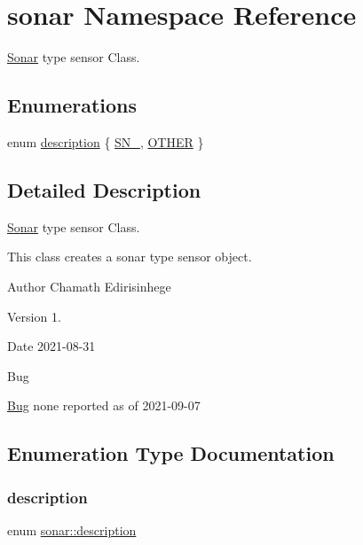 \hypertarget{namespacesonar}{}\section{sonar Namespace Reference}
\label{namespacesonar}


\hyperlink{classSonar}{Sonar} type sensor Class.  


\subsection*{Enumerations}
\begin{DoxyCompactItemize}
\item 
enum \hyperlink{namespacesonar_a3fd8bcda99ebc0ba5ba1f926196fdf6b}{description} \{ \hyperlink{namespacesonar_a3fd8bcda99ebc0ba5ba1f926196fdf6bace28bea2af6a79cd82af821642536337}{S\+N\+\_}, 
\hyperlink{namespacesonar_a3fd8bcda99ebc0ba5ba1f926196fdf6bac9f299206371e91f88ec91dd87a91b8f}{O\+T\+H\+ER}
 \}
\end{DoxyCompactItemize}


\subsection{Detailed Description}
\hyperlink{classSonar}{Sonar} type sensor Class. 

This class creates a sonar type sensor object. \begin{DoxyAuthor}{Author}
Chamath Edirisinhege 
\end{DoxyAuthor}
\begin{DoxyVersion}{Version}
1. 
\end{DoxyVersion}
\begin{DoxyDate}{Date}
2021-\/08-\/31 
\end{DoxyDate}
\begin{DoxyRefDesc}{Bug}
\item[\hyperlink{bug__bug000010}{Bug}]none reported as of 2021-\/09-\/07 \end{DoxyRefDesc}


\subsection{Enumeration Type Documentation}
\mbox{\label{namespacesonar_a3fd8bcda99ebc0ba5ba1f926196fdf6b}} 
\subsubsection{\texorpdfstring{description}{description}}
{\footnotesize\ttfamily enum \hyperlink{namespacesonar_a3fd8bcda99ebc0ba5ba1f926196fdf6b}{sonar\+::description}}

